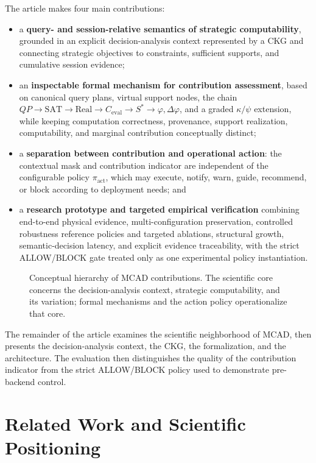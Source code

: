\documentclass[journal]{IEEEtran}
\begin{document}
The article makes four main contributions:
\begin{itemize}
  \item a \textbf{query- and session-relative semantics of strategic computability}, grounded in an explicit decision-analysis context represented by a CKG and connecting strategic objectives to constraints, sufficient supports, and cumulative session evidence;
  \item an \textbf{inspectable formal mechanism for contribution assessment}, based on canonical query plans, virtual support nodes, the chain $QP\rightarrow\mathrm{SAT}\rightarrow\mathrm{Real}\rightarrow C_{\mathrm{eval}}\rightarrow S^*\rightarrow\varphi,\Delta\varphi$, and a graded $\kappa/\psi$ extension, while keeping computation correctness, provenance, support realization, computability, and marginal contribution conceptually distinct;
  \item a \textbf{separation between contribution and operational action}: the contextual mask and contribution indicator are independent of the configurable policy $\pi_{\mathrm{act}}$, which may execute, notify, warn, guide, recommend, or block according to deployment needs; and
  \item a \textbf{research prototype and targeted empirical verification} combining end-to-end physical evidence, multi-configuration preservation, controlled robustness reference policies and targeted ablations, structural growth, semantic-decision latency, and explicit evidence traceability, with the strict ALLOW/BLOCK gate treated only as one experimental policy instantiation.
\end{itemize}

\begin{figure}[!t]
\centering
\resizebox{0.95\textwidth}{!}{}
\caption{Conceptual hierarchy of MCAD contributions. The scientific core concerns the decision-analysis context, strategic computability, and its variation; formal mechanisms and the action policy operationalize that core.}
\label{fig:contribution-hierarchy}
\end{figure}

The remainder of the article examines the scientific neighborhood of MCAD, then presents the decision-analysis context, the CKG, the formalization, and the architecture. The evaluation then distinguishes the quality of the contribution indicator from the strict ALLOW/BLOCK policy used to demonstrate pre-backend control.

\section{Related Work and Scientific Positioning}
\label{sec:related}
\end{document}
